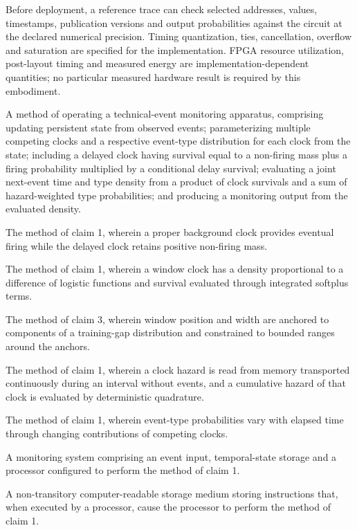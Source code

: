 \documentclass[pct]{sm-patent}
\begin{document}
\pnum Before deployment, a reference trace can check selected addresses, values, timestamps, publication versions and output probabilities against the circuit at the declared numerical precision. Timing quantization, ties, cancellation, overflow and saturation are specified for the implementation. FPGA resource utilization, post-layout timing and measured energy are implementation-dependent quantities; no particular measured hardware result is required by this embodiment.

\claimsstart

\begin{patentclaims}

\item A method of operating a technical-event monitoring apparatus, comprising updating persistent state from observed events; parameterizing multiple competing clocks and a respective event-type distribution for each clock from the state; including a delayed clock having survival equal to a non-firing mass plus a firing probability multiplied by a conditional delay survival; evaluating a joint next-event time and type density from a product of clock survivals and a sum of hazard-weighted type probabilities; and producing a monitoring output from the evaluated density.

\item The method of claim 1, wherein a proper background clock provides eventual firing while the delayed clock retains positive non-firing mass.

\item The method of claim 1, wherein a window clock has a density proportional to a difference of logistic functions and survival evaluated through integrated softplus terms.

\item The method of claim 3, wherein window position and width are anchored to components of a training-gap distribution and constrained to bounded ranges around the anchors.

\item The method of claim 1, wherein a clock hazard is read from memory transported continuously during an interval without events, and a cumulative hazard of that clock is evaluated by deterministic quadrature.

\item The method of claim 1, wherein event-type probabilities vary with elapsed time through changing contributions of competing clocks.

\item A monitoring system comprising an event input, temporal-state storage and a processor configured to perform the method of claim 1.

\item A non-transitory computer-readable storage medium storing instructions that, when executed by a processor, cause the processor to perform the method of claim 1.

\end{patentclaims}
\end{document}
